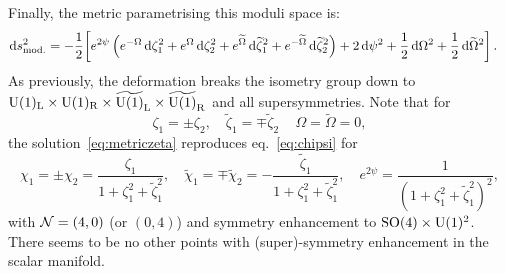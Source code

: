 \documentclass[a4paper, 11pt]{article}
\numberwithin{equation}{section}
\newcommand{\ts}[1]{\widetilde{#1}}
\newcommand{\+}{\oplus}
\renewcommand{\d}{\ensuremath{\mathrm{d}}\xspace}
\begin{document}
Finally, the metric parametrising this moduli space is:
\begin{equation}
	\begin{aligned}
		\d s^{2}_{\rm mod.} &= -\frac{1}{2}\bigg[e^{2\psi}\left(e^{-\Omega}\,\d\zeta_{1}^{2}+e^{\Omega}\,\d\zeta_{2}^{2}+e^{\ts{\Omega}}\,\d\ts{\zeta}_{1}^{2}+e^{-\ts{\Omega}}\,\d\ts{\zeta}_{2}^{2}\right) +2\,\d\psi^{2} + \frac{1}{2}\,\d\Omega^{2}+ \frac{1}{2}\,\d\ts{\Omega}^{2}\bigg]\,.
	\end{aligned}
\end{equation}
As previously, the deformation breaks the isometry group down to ${\rm U}(1)_{\rm L}\times{\rm U}(1)_{\rm R}\times\ts{{\rm U}(1)}_{\rm L}\times\ts{{\rm U}(1)}_{\rm R}$ and all supersymmetries. Note that for
\begin{equation}
	\zeta_{1}=\pm\zeta_{2},\quad \ts{\zeta}_{1}=\mp\ts{\zeta}_{2}\,\quad\Omega=\ts{\Omega}=0,
\end{equation}
the solution~\eqref{eq:metriczeta} reproduces eq.~\eqref{eq:chipsi} for
\begin{equation}
	\chi_{1}=\pm\chi_{2}=\frac{\zeta_{1}}{1+\zeta_{1}^{2}+\ts{\zeta}_{1}^{2}},\quad \ts{\chi}_{1}=\mp\ts{\chi}_{2}=-\frac{\ts{\zeta}_{1}}{1+\zeta_{1}^{2}+\ts{\zeta}_{1}^{2}},\quad e^{2\psi}=\frac{1}{(1+\zeta_{1}^{2}+\ts{\zeta}_{1}^{2})^{2}},
\end{equation}
with ${\cal N}=(4,0)$ (or $(0,4)$) and symmetry enhancement to ${\rm SO}(4)\times{\rm U}(1)^{2}$. There seems to be no other points with (super)-symmetry enhancement in the scalar manifold.
\end{document}
